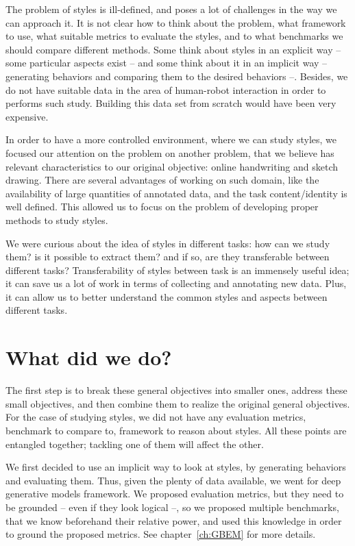   \par The problem of styles is ill-defined, and poses a lot of challenges in the way we can approach it. It is not clear how to think about the problem, what framework to use, what suitable metrics to evaluate the styles, and to what benchmarks we should compare different methods. Some think about styles in an explicit way -- some particular aspects exist -- and some think about it in an implicit way -- generating behaviors and comparing them to the desired behaviors --. Besides, we do not have suitable data in the area of human-robot interaction in order to performs such study. Building this data set from scratch would have been very expensive.

  \par In order to have a more controlled environment, where we can study styles, we focused our attention on the problem on another problem, that we believe has relevant characteristics to our original objective: online handwriting and sketch drawing. There are several advantages of working on such domain, like the availability of large quantities of annotated data, and the task content/identity is well defined. This allowed us to focus on the problem of developing proper methods to study styles.

  \par We were curious about the idea of styles in different tasks: how can we study them? is it possible to extract them? and if so, are they transferable between different tasks? Transferability of styles between task is an immensely useful idea; it can save us a lot of work in terms of collecting and annotating new data. Plus, it can allow us to better understand the common styles and aspects between different tasks.

\section{What did we do?}

  \par The first step is to break these general objectives into smaller ones, address these small objectives, and then combine them to realize the original general objectives. For the case of studying styles, we did not have any evaluation metrics, benchmark to compare to, framework to reason about styles. All these points are entangled together; tackling one of them will affect the other.

  \par We first decided to use an implicit way to look at styles, by generating behaviors and evaluating them. Thus, given the plenty of data available, we went for deep generative models framework. We proposed evaluation metrics, but they need to be grounded -- even if they look logical --, so we proposed multiple benchmarks, that we know beforehand their relative power, and used this knowledge in order to ground the proposed metrics. See chapter~\ref{ch:GBEM} for more details.

